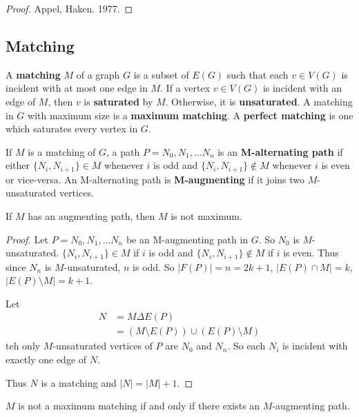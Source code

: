 \documentclass[12pt]{article}
\begin{document}
\begin{proof}
Appel, Haken. 1977.
\end{proof}

\subsection{Matching}
A {\bf matching} $M$ of a graph $G$ is a subset of $E(G)$ such that each $v\in V(G)$ is incident with at most one edge in $M$. If a vertex $v\in V(G)$ is incident with an edge of $M$, then $v$ is {\bf saturated} by $M$. Otherwise, it is {\bf unsaturated}. A matching in $G$ with maximum size is a {\bf maximum matching}. A {\bf perfect matching} is one which saturates every vertex in $G$.

If $M$ is a matching of $G$, a path $P = N_0, N_1, \dots N_n$ is an {\bf M-alternating path} if either $\{ N_i, N_{i+1} \} \in M$ whenever $i$ is odd and $\{ N_i, N_{i+1} \} \notin M$ whenever $i$ is even or vice-versa. An M-alternating path is {\bf M-augmenting} if it joins two $M$-unsaturated vertices.

\begin{lemma}
\label{augmentingIsNotMaximum}
If $M$ has an augmenting path, then $M$ is not maximum.
\end{lemma}

\begin{proof}
Let $P = N_0, N_1, \dots N_n$ be an M-augmenting path in $G$. So $N_0$ is $M$-unsaturated. $\{ N_i, N_{i+1} \} \in M$ if $i$ is odd and $\{ N_i, N_{i+1} \} \notin M$ if $i$ is even. Thus since $N_n$ is $M$-unsaturated, $n$ is odd. So $|F(P)| = n = 2k + 1$, $|E(P) \cap M| = k$, $|E(P) \setminus M| = k + 1$.

Let
\begin{align*}
N &= M \Delta E(P)\\
&= (M \setminus E(P)) \cup (E(P) \setminus M)
\end{align*}
teh only $M$-unsaturated vertices of $P$ are $N_0$ and $N_n$. So each $N_i$ is incident with exactly one edge of $N$.

Thus $N$ is a matching and $|N| = |M| + 1$.
\end{proof}

\begin{lemma}
$M$ is not a maximum matching if and only if there exists an $M$-augmenting path.
\end{lemma}
\end{document}
